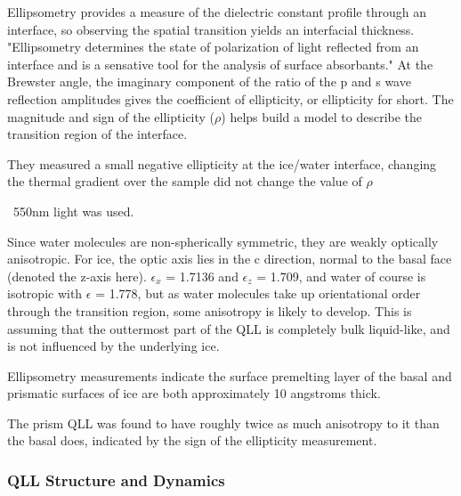 %
%

Ellipsometry provides a measure of the dielectric constant profile through an interface, so observing the spatial transition yields an interfacial thickness. "Ellipsometry determines the state of polarization of light reflected from an interface and is a sensative tool for the analysis of surface absorbants." At the Brewster angle, the imaginary component of the ratio of the p and s wave reflection amplitudes gives the coefficient of ellipticity, or ellipticity for short. The magnitude and sign of the ellipticity ($\rho$) helps build a model to describe the transition region of the interface.

They measured a small negative ellipticity at the ice/water interface, changing the thermal gradient over the sample did not change the value of $\rho$  

~550nm light was used.

Since water molecules are non-spherically symmetric, they are weakly
optically anisotropic. For ice, the optic axis lies in the c
direction, normal to the basal face (denoted the z-axis
here). $\epsilon_{x}$ = 1.7136 and $\epsilon_{z}$ = 1.709, and water
of course is isotropic with $\epsilon$ = 1.778, but as water molecules
take up orientational order through the transition region, some
anisotropy is likely to develop. This is assuming that the outtermost
part of the QLL is completely bulk liquid-like, and is not influenced
by the underlying ice.

Ellipsometry measurements indicate the surface premelting layer of the basal and prismatic surfaces of ice are both approximately 10 angstroms thick.

The prism QLL was found to have roughly twice as much anisotropy to it
than the basal does, indicated by the sign of the ellipticity
measurement.
\subsubsection{QLL Structure and Dynamics}

